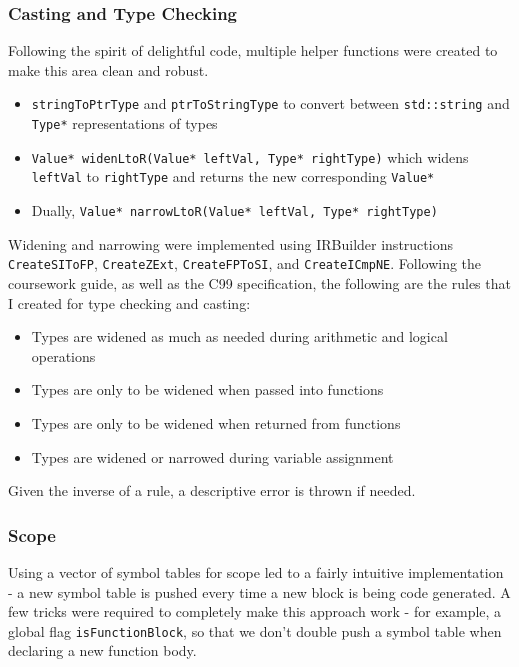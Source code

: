 \documentclass[10pt,a4paper]{article}
\newcommand{\code}[1]{\lstinline!#1!}
\begin{document}
\subsubsection*{Casting and Type Checking}
Following the spirit of delightful code, multiple helper functions were created to make this area clean and robust. 
\begin{itemize}
    \item \code{stringToPtrType} and \code{ptrToStringType} to convert between \code{std::string} and \code{Type*} representations of types
    \item \code{Value* widenLtoR(Value* leftVal, Type* rightType)} which widens \code{leftVal} to \code{rightType} and returns the new corresponding \code{Value*}
    \item Dually, \code{Value* narrowLtoR(Value* leftVal, Type* rightType)}
\end{itemize}
Widening and narrowing were implemented using IRBuilder instructions \code{CreateSIToFP}, \code{CreateZExt}, \code{CreateFPToSI}, and \code{CreateICmpNE}. Following the coursework guide, as well as the C99 specification, the following are the rules that I created for type checking and casting:
\begin{itemize}
    \item Types are widened as much as needed during arithmetic and logical operations
    \item Types are only to be widened when passed into functions
    \item Types are only to be widened when returned from functions
    \item Types are widened or narrowed during variable assignment
\end{itemize}
Given the inverse of a rule, a descriptive error is thrown if needed.
\subsubsection*{Scope}
Using a vector of symbol tables for scope led to a fairly intuitive implementation - a new symbol table is pushed every time a new block is being code generated. A few tricks were required to completely make this approach work - for example, a global flag \code{isFunctionBlock}, so that we don't double push a symbol table when declaring a new function body.
\end{document}
